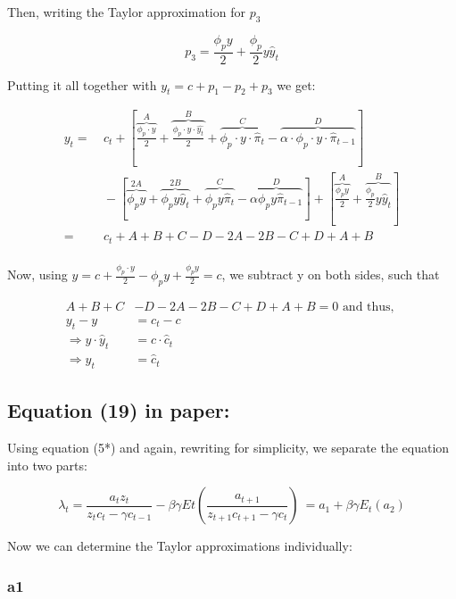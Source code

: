 \documentclass[11pt,preprint, authoryear]{elsarticle}
\numberwithin{equation}{section}
\numberwithin{figure}{section}
\numberwithin{table}{section}
\begin{document}
Then, writing the Taylor approximation for \(p_{3}\)

\[p_{3} = \frac{\phi_{p} y} {2} + \frac{\phi_{p}}{2}y \hat{y}_{t}\]

Putting it all together with \(y_{t} = c + p_{1} - p_{2} + p_{3}\) we
get:

\[\begin{aligned}
y_{t} = & \ c_t  +\left[ \overbrace{\frac{\phi_{p} \cdot y}{2}}^{A} + \overbrace{\frac{\phi_{p} \cdot y \cdot \hat{y_{t}} }{2}}^{B} + \overbrace{\phi_{p} \cdot y \cdot \hat{\pi}_{t}}^{C} - \overbrace{\alpha \cdot \phi_{p} \cdot y \cdot \hat{\pi}_{t-1}}^{D} \right] \\ & \ - \left[ \overbrace{\phi_{p} y}^{2A} + \overbrace{\phi_{p} y \hat{y}_{t}}^{2B} + \overbrace{ \phi_{p} y \hat{\pi}_{t}}^{C} - \overbrace{\alpha \phi_{p} y \hat{\pi}_{t-1}}^{D} \right] + \left[ \overbrace{\frac{\phi_{p} y} {2}}^{A} + \overbrace{\frac{\phi_{p}}{2}y \hat{y}_{t}}^{B} \right] \\= &\  c_{t} + A + B + C -D - 2A - 2B - C + D + A + B\\
\end{aligned}\]

Now, using
\(y = c + \frac{\phi_{p} \cdot y}{2} - \phi_{p} y + \frac{\phi_{p} y} {2} = c\),
we subtract y on both sides, such that

\[\begin{aligned}
A + B + C &- D - 2A - 2B - C + D + A + B = 0
\text{ and thus, }
\\
y_{t} - y &= c_t - c
\\
\Rightarrow y \cdot \hat{y}_t &= c \cdot \hat{c}_t
\\
\Rightarrow \hat{y}_t &= \hat{c}_t
\end{aligned}\]

\hypertarget{equation-19-in-paper}{%
\subsection{Equation (19) in paper:}\label{equation-19-in-paper}}

Using equation (5*) and again, rewriting for simplicity, we separate the
equation into two parts:

\[\lambda_{t}=\frac{a_{t} z_{t}}{z_{t} c_{t}-\gamma c_{t-1}}-\beta \gamma E{t}\left(\frac{a_{t+1}}{z_{t+1} c_{t+1}-\gamma c_{t}}\right)\
= a_1 + \beta \gamma E_t (a_2)\]

Now we can determine the Taylor approximations individually:

\hypertarget{a1}{%
\subsubsection{a1}\label{a1}}
\end{document}
